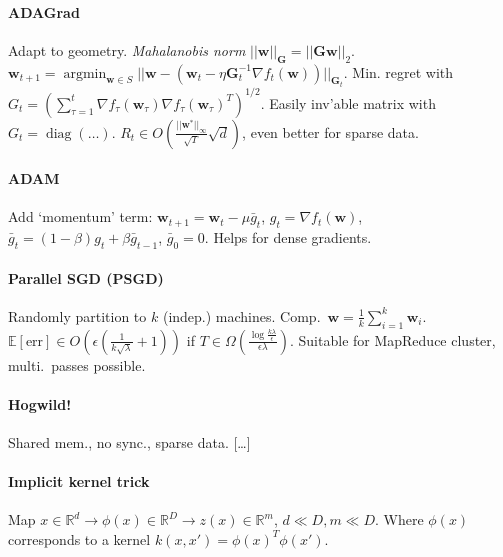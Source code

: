 \documentclass[9pt]{scrartcl}
\DeclareMathOperator{\diag}{diag}
\DeclareMathOperator{\argmin}{argmin}
\newcommand{\eps}{\epsilon}
\newcommand{\R}{\mathbb{R}}
\newcommand{\E}{\mathbb{E}}
\begin{document}
\begin{twocolumn}
\paragraph{ADAGrad}
Adapt to geometry.
\emph{Mahalanobis norm} $||\bm w||_{\bm G} = ||\bm G\bm w||_2$. \\
$\bm w_{t+1}=\argmin_{\bm w\in S}||\bm w - (\bm w_t - \eta \bm G_t^{-1}\nabla f_t(\bm w))||_{\bm G_t}$.
Min. regret with $G_t = (\sum_{\tau = 1}^{t} \nabla f_\tau(\bm w_\tau)\nabla f_\tau(\bm w_\tau)^T)^{1/2}.$
Easily inv'able matrix with $G_t = \diag(\dots).$
$R_t \in O(\frac{||\bm w^*||_\infty}{\sqrt T}\sqrt d)$, even better for sparse data.

\paragraph{ADAM}
Add `momentum' term: $\bm w_{t+1} = \bm w_t - \mu\bar g_t$, $g_t = \nabla f_t(\bm w)$, $\bar g_t = (1-\beta)g_t + \beta \bar g_{t-1}$, $\bar g_0 = 0$.
Helps for dense gradients.

\paragraph{Parallel SGD (PSGD)}
Randomly partition to $k$ (indep.) machines. Comp.\ $\bm w = \frac{1}{k}\sum_{i=1}^k \bm w_i$.
$\E[\text{err}] \in O(\eps(\frac{1}{k\sqrt\lambda}+1))$ if $T \in \Omega(\frac{\log \frac{k\lambda}{\eps}}{\eps\lambda})$.
Suitable for MapReduce cluster, multi.\ passes possible.

\paragraph{Hogwild!}
Shared mem., no sync., sparse data. [\dots]

\paragraph{Implicit kernel trick}
Map $x \in \R^d \rightarrow \phi(x) \in \R^D \rightarrow z(x) \in \R^m$, $d \ll D, m \ll D$.
Where $\phi(x)$ corresponds to a kernel $k(x,x') = \phi(x)^T\phi(x')$.


\end{twocolumn}
\end{document}

